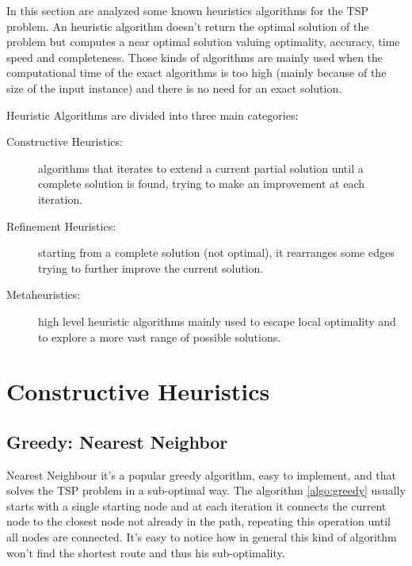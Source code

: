 In this section are analyzed some known heuristics algorithms for the TSP problem. An heuristic algorithm doesn’t return the optimal solution of the problem but computes a near optimal solution valuing optimality, accuracy, time speed and completeness. Those kinds of algorithms are mainly used when the computational time of the exact algorithms is too high (mainly because of the size of the input instance) and there is no need for an exact solution.

Heuristic Algorithms are divided into three main categories:
\begin{description}
    \item[Constructive Heuristics:] algorithms that iterates to extend a current partial solution until a complete solution is found, trying to make an improvement at each iteration.
    \item[Refinement Heuristics:] starting from a complete solution (not optimal), it rearranges some edges trying to further improve the current solution.
    \item[Metaheuristics:] high level heuristic algorithms mainly used to escape local optimality and to explore a more vast range of possible solutions.
\end{description}

\section{Constructive Heuristics}
\subsection{Greedy: Nearest Neighbor}
Nearest Neighbour it’s a popular greedy algorithm, easy to implement, and that solves the TSP problem in a sub-optimal way. The algorithm \ref{algo:greedy} usually starts with a single starting node and at each iteration it connects the current node to the closest node not already in the path, repeating this operation until all nodes are connected. It’s easy to notice how in general this kind of algorithm won’t find the shortest route and thus his sub-optimality.

